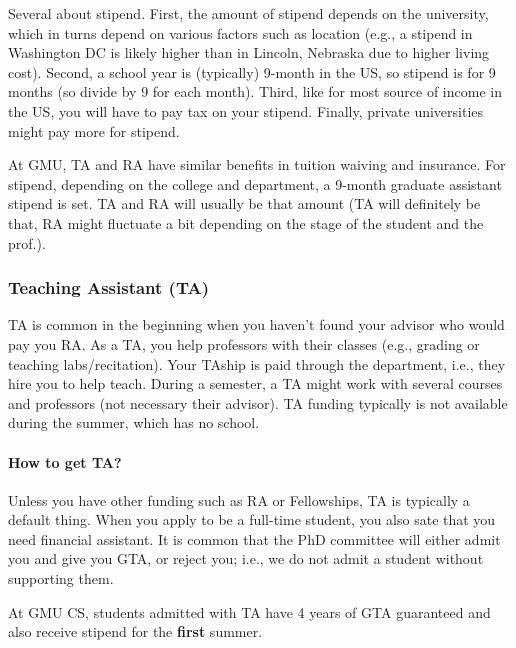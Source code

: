 \documentclass[10pt]{article}
\begin{document}
Several about stipend. First, the amount of stipend depends on the university, which in turns depend on various factors such as location (e.g., a stipend in Washington DC is likely higher than in Lincoln, Nebraska due to higher living cost). Second, a school year is (typically) 9-month in the US, so stipend is for 9 months (so divide by 9 for each month). Third, like for most source of income in the US, you will have to pay tax on your stipend. Finally, private universities might pay more for stipend.

\begin{tcolorbox}[left=1pt,right=1pt,top=1pt,bottom=1pt]
At GMU, TA and RA have similar benefits in tuition waiving and insurance.  For stipend, depending on the college and department, a 9-month graduate assistant stipend is set.  TA and RA will usually be that amount (TA will definitely be that, RA might fluctuate a bit depending on the stage of the student and the prof.). 
\end{tcolorbox}

\subsubsection{Teaching Assistant (TA)}

TA is common in the beginning when you haven't found your advisor who would pay you RA. As a TA, you help professors with their classes (e.g., grading or teaching labs/recitation). Your TAship is paid through the department, i.e., they hire you to help teach.  During a semester, a TA might work with several courses and professors (not necessary their advisor).  TA funding typically is not available during the summer, which has no school.

\paragraph{How to get TA?}  Unless you have other funding such as RA or Fellowships, TA is typically a default thing. When you apply to be a full-time student, you also sate that you need financial assistant. It is common that the PhD committee will either admit you and give you GTA, or reject you; i.e., we do not admit a student without supporting them.  

\begin{tcolorbox}[left=1pt,right=1pt,top=1pt,bottom=1pt]
At GMU CS, students admitted with TA have  4 years of GTA guaranteed and also receive  stipend for the \textbf{first} summer.
\end{tcolorbox}
\end{document}
